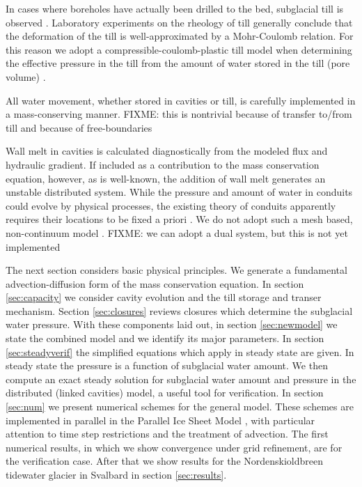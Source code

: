 \documentclass[11pt,final]{amsart}
\begin{document}
In cases where boreholes have actually been drilled to the bed, subglacial till is observed \citep{Hookeetal1997,TrufferHarrisonEchelmeyer2000,TrufferHarrison2006,Tulaczyketal2000}.  Laboratory experiments on the rheology of till \citep{Hookeetal1997,TrufferEchelmeyerHarrison2001,Tulaczyketal2000} generally conclude that the deformation of the till is well-approximated by a Mohr-Coulomb relation.  For this reason we adopt a compressible-coulomb-plastic till model when determining the effective pressure in the till from the amount of water stored in the till (pore volume) \citep{Tulaczyketal2000}.

All water movement, whether stored in cavities or till, is carefully implemented in a mass-conserving manner.  FIXME: this is nontrivial because of transfer to/from till and because of free-boundaries

Wall melt in cavities is calculated diagnostically from the modeled flux and hydraulic gradient.  If included as a contribution to the mass conservation equation, however, as is well-known, the addition of wall melt generates an unstable distributed system.  While the pressure and amount of water in conduits could evolve by physical processes, the existing theory of conduits apparently requires their locations to be fixed a priori \citep{Hewittetal2012,PimentelFlowers2011,Schoofmeltsupply}.  We do not adopt such a mesh based, non-continuum model \citep[compare][]{Hewittetal2012}.  FIXME: we can adopt a dual system, but this is not yet implemented

The next section considers basic physical principles.  We generate a fundamental advection-diffusion form of the mass conservation equation.  In section \ref{sec:capacity} we consider cavity evolution and the till storage and transer mechanism.  Section \ref{sec:closures} reviews closures which determine the subglacial water pressure.  With these components laid out, in section \ref{sec:newmodel} we state the combined model and we identify its major parameters.  In section \ref{sec:steadyverif} the simplified equations which apply in steady state are given.  In steady state the pressure is a function of subglacial water amount.  We then compute an exact steady solution for subglacial water amount and pressure in the distributed (linked cavities) model, a useful tool for verification.  In section \ref{sec:num} we present numerical schemes for the general model.  These schemes are implemented in parallel in the Parallel Ice Sheet Model \citep{pism-user-manual}, with particular attention to time step restrictions and the treatment of advection.  The first numerical results, in which we show convergence under grid refinement, are for the verification case.  After that we show results for the Nordenskioldbreen tidewater glacier in Svalbard in section \ref{sec:results}.
\end{document}
